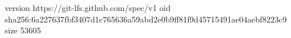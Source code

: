version https://git-lfs.github.com/spec/v1
oid sha256:6a227637fbf3407d1c765636a59abd2e0b9ff81f9d45715491ae04aebf8223c9
size 53605
